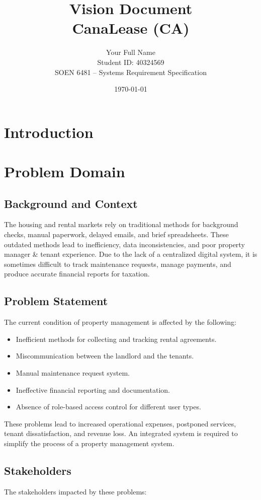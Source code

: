 \documentclass[12pt]{article}
\title{Vision Document\\\large CanaLease (CA)}
\author{Your Full Name \\ Student ID: 40324569 \\ SOEN 6481 -- Systems Requirement Specification}
\date{\today}
\begin{document}
\maketitle
\tableofcontents
\newpage

\section{Introduction}

\section{Problem Domain}

\subsection{Background and Context}
The housing and rental markets rely on traditional methods for background checks, manual paperwork, delayed emails, and brief spreadsheets. These outdated methods lead to inefficiency, data inconsistencies, and poor property manager & tenant experience. Due to the lack of a centralized digital system, it is sometimes difficult to track maintenance requests, manage payments, and produce accurate financial reports for taxation.   

\subsection{Problem Statement}
The current condition of property management is affected by the following:
\begin{itemize}
    \item Inefficient methods for collecting and tracking rental agreements.
    \item Miscommunication between the landlord and the tenants.
    \item Manual maintenance request system.
    \item Ineffective financial reporting and documentation.
    \item Absence of role-based access control for different user types.

\end{itemize}
These problems lead to increased operational expenses, postponed services, tenant dissatisfaction, and revenue loss. An integrated system is required to simplify the process of a property management system.

\subsection{Stakeholders}
The stakeholders impacted by these problems:
\end{document}
